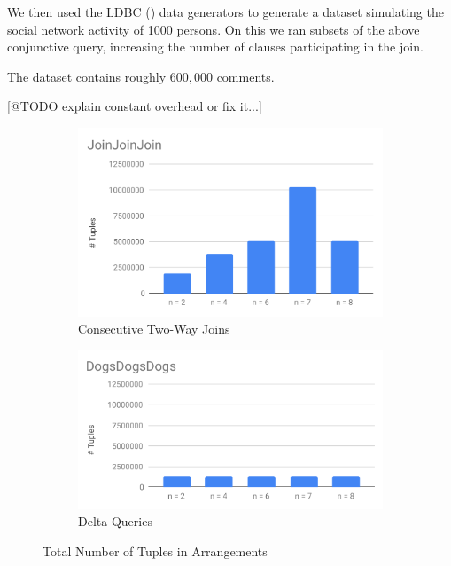 \documentclass[../catalog.tex]{subfiles}
\begin{document}
We then used the LDBC (\cite{erling2015ldbc}) data generators to
generate a dataset simulating the social network activity of 1000
persons. On this we ran subsets of the above conjunctive query,
increasing the number of clauses participating in the join.

The dataset contains roughly $600,000$ comments.

[@TODO explain constant overhead or fix it...]

\begin{figure}[h!]
  \begin{subfigure}{.5\textwidth}
    \includegraphics[width=1.0\linewidth]{results/join-state/joinjoinjoin}
    \caption{Consecutive Two-Way Joins}
  \end{subfigure}
  \begin{subfigure}{.5\textwidth}
    \includegraphics[width=1.0\linewidth]{results/join-state/dogsdogsdogs}
    \caption{Delta Queries}
  \end{subfigure}

  \caption{Total Number of Tuples in Arrangements}
  \label{fig:tuple-counts}
\end{figure}
\end{document}
